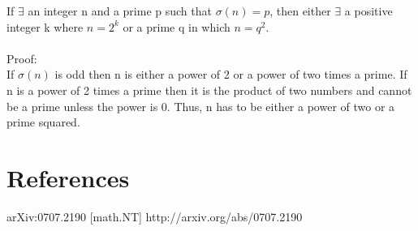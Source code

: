 \documentclass[12pt]{amsart}
\begin{document}
\thm
If $\exists$ an integer n and a prime p such that $\sigma(n) = p$, then either $\exists$ a positive integer k where $n = 2^k$ or a prime q in which $n = q^2$.
\\
\\
\noindent
Proof:
\\
If $\sigma(n)$ is odd then n is either a power of 2 or a power of two times a prime. If n is a power of 2 times a prime then it is the product of two numbers and cannot be a prime unless the power is 0. Thus, n has to be either a power of two or a prime squared.

\section{References}
arXiv:0707.2190 [math.NT]   http://arxiv.org/abs/0707.2190  
\end{document}

